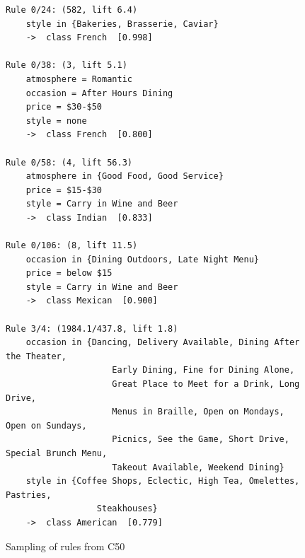 \documentclass[letterpaper,10pt]{article}
\begin{document}
\begin{figure}[h]
\begin{verbatim}
Rule 0/24: (582, lift 6.4)
	style in {Bakeries, Brasserie, Caviar}
	->  class French  [0.998]

Rule 0/38: (3, lift 5.1)
	atmosphere = Romantic
	occasion = After Hours Dining
	price = $30-$50
	style = none
	->  class French  [0.800]
	
Rule 0/58: (4, lift 56.3)
	atmosphere in {Good Food, Good Service}
	price = $15-$30
	style = Carry in Wine and Beer
	->  class Indian  [0.833]

Rule 0/106: (8, lift 11.5)
	occasion in {Dining Outdoors, Late Night Menu}
	price = below $15
	style = Carry in Wine and Beer
	->  class Mexican  [0.900]
	
Rule 3/4: (1984.1/437.8, lift 1.8)
	occasion in {Dancing, Delivery Available, Dining After the Theater,
                     Early Dining, Fine for Dining Alone,
                     Great Place to Meet for a Drink, Long Drive,
                     Menus in Braille, Open on Mondays, Open on Sundays,
                     Picnics, See the Game, Short Drive, Special Brunch Menu,
                     Takeout Available, Weekend Dining}
	style in {Coffee Shops, Eclectic, High Tea, Omelettes, Pastries,
                  Steakhouses}
	->  class American  [0.779]
\end{verbatim}
\caption{Sampling of rules from C50}
\label{fig:c50} 
\end{figure}
\end{document}
